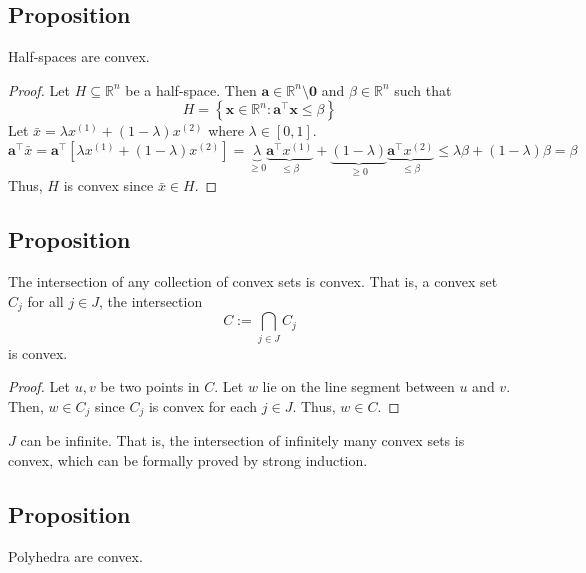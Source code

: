 \begin{thmbox}
    \subsection{Proposition}
    Half-spaces are convex.
\end{thmbox}
\begin{proof}
    Let $ H\subseteq\mathbb{R}^n $ be a half-space. Then $ \bm{a} \in \mathbb{R}
    ^n\setminus{\bm{0}} $ and $ \beta\in\mathbb{R}^n $ such that
    \[ H=\left\{\bm{x}\in\mathbb{R}^n: \bm{a} ^\top \bm{x}\le\beta \right\} \]
    Let $ \bar{x}=\lambda x^{(1)} + (1-\lambda)x^{(2)} $ where $ \lambda\in[0,1] $.
    \[ \bm{a}^\top\bar{x}=\bm{a}^\top\left[\lambda x^{(1)} + (1-\lambda)x^{(2)}\right]=
    \underbrace{\lambda}_{\ge 0}\underbrace{\bm{a} ^\top x^{(1)}}_{\le \beta}+
    \underbrace{(1-\lambda)}_{\ge 0}\underbrace{\bm{a} ^\top x^{(2)}}_{\le \beta}
    \le \lambda \beta + (1-\lambda)\beta=\beta \]
    Thus, $ H $ is convex since $ \bar{x}\in H $.
\end{proof}

\begin{thmbox}
    \subsection{Proposition}
    The intersection of any collection of convex sets is convex. 
    That is, a convex set $ C_j $ for all $ j\in J $, the intersection
    \[ C:=\bigcap_{j\in J} C_j \]
    is convex.
\end{thmbox}

\begin{proof}
    Let $ u,v $ be two points in $ C $. Let $ w $ lie on the line
    segment between $ u $ and $ v $. Then, $ w\in C_j $ since $ C_j $ is convex
    for each $ j\in J $. Thus, $ w\in C $.
\end{proof}

\begin{remark}
    $ J $ can be infinite. That is, the intersection of infinitely many convex sets
    is convex, which can be formally proved by strong induction.
\end{remark}

\begin{thmbox}
    \subsection{Proposition}
    Polyhedra are convex.
\end{thmbox}


